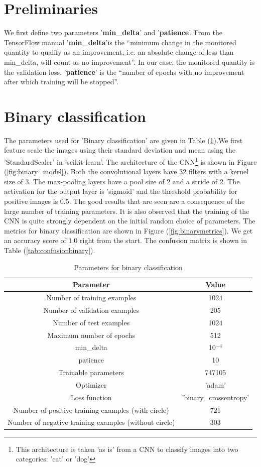 \documentclass{article}
\begin{document}
\section{Preliminaries}
We first define two parameters '\textbf{min\_delta}' and '\textbf{patience}'. From the TensorFlow manual '\textbf{min\_delta}'is the ``minimum change in the monitored quantity to qualify as an improvement, i.e. an absolute change of less than min\_delta, will count as no improvement''. In our case, the monitored quantity is the validation loss. '\textbf{patience}' is the ``number of epochs with no improvement after which training will be stopped''.
\section{Binary classification}
 The parameters used for 'Binary classification' are given in Table (\ref{tab:binaryparam}).We first feature scale the images using their standard deviation and mean using the 'StandardScaler' in 'scikit-learn'. The architecture of the CNN\footnote{This architecture is taken 'as is' from a CNN to classify images into two categories: 'cat' or 'dog'} is shown in Figure (\ref{fig:binary_model}). Both the convolutional layers have $32$ filters with a kernel size of $3$. The max-pooling layers have a pool size of $2$ and a stride of $2$. The activation for the output layer is 'sigmoid' and the threshold probability for positive images is $0.5$. The good results that are seen are a consequence of the large number of training parameters. It is also observed that the training of the CNN is quite strongly dependent on the initial random choice of parameters. The metrics for binary classification are shown in Figure (\ref{fig:binarymetrics}). We get an accuracy score of $1.0$ right from the start. The confusion matrix is shown in Table (\ref{tab:confusionbinary}). 
\begin{table}
  \centering
  \begin{tabular}{|c|c|}
    \hline
    Parameter & Value \\
    \hline
    Number of training examples   & 1024 \\
    Number of validation examples & 205 \\
    Number of test examples       & 1024 \\
    Maximum number of epochs      & 512 \\
    min{\_}delta      & 10$^{-4}$\\
    patience                      & 10  \\
    Trainable parameters          & 747105\\
    Optimizer         & 'adam'     \\
    Loss function     & 'binary\_crossentropy' \\
    Number of positive training examples (with circle) & 721\\
    Number of negative training examples (without circle) & 303\\
    \hline
  \end{tabular}
  \caption{\label{tab:binaryparam} Parameters for binary classification}
\end{table}
\end{document}

